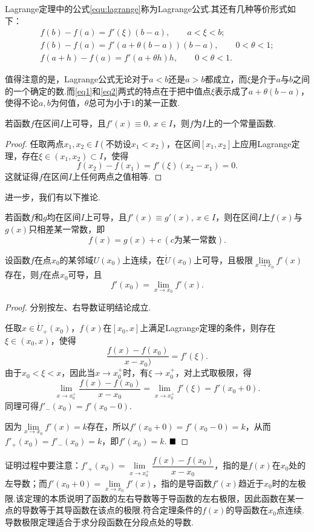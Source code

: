 Lagrange定理中的公式\ref{equ:lagrange}称为{\heiti Lagrange公式}.其还有几种等价形式如下：
\begin{align}
	f(b)-f(a)=f'(\xi)(b-a),\qquad a<\xi<b;\\
	\label{eq1}	f(b)-f(a)=f'(a+\theta(b-a))(b-a),\qquad 0<\theta<1;\\
	\label{eq2}	f(a+h)-f(a)=f'(a+\theta h)h,\qquad 0<\theta<1.
\end{align}

值得注意的是，Lagrange公式无论对于$a<b$还是$a>b$都成立，而$\xi$是介于$a$与$b$之间的一个确定的数.而\ref{eq1}和\ref{eq2}两式的特点在于把中值点$\xi$表示成了$a+\theta(b-a)$，使得不论$a,b$为何值，$\theta$总可为小于$1$的某一正数.
\begin{corollary}
	若函数$f$在区间$I$上可导，且$f'(x)\equiv 0,\ x\in I$，则$f$为$I$上的一个常量函数.
\end{corollary}
\begin{proof}
	任取两点$x_1,x_2\in I(\text{不妨设}x_1<x_2)$，在区间$\left[x_1,x_2\right]$上应用Lagrange定理，存在$\xi\in(x_1,x_2)\subset I$，使得
	$$f(x_2)-f(x_1)=f'(\xi)(x_2-x_1)=0.$$
	这就证得$f$在区间$I$上任何两点之值相等.
\end{proof}
进一步，我们有以下推论.
\begin{corollary}
	若函数$f$和$g$均在区间$I$上可导，且$f'(x)\equiv g'(x),\ x\in I$，则在区间$I$上$f(x)$与$g(x)$只相差某一常数，即
	$$f(x)=g(x)+c\ (c\text{为某一常数}).$$
\end{corollary}
\begin{corollary}[导数极限定理]
	设函数$f$在点$x_0$的某邻域$U(x_0)$上连续，在$\mathring{U}(x_0)$上可导，且极限$\lim\limits_{x\to x_0}f'(x)$存在，则$f$在点$x_0$可导，且
	$$f'(x_0)=\lim\limits_{x\to x_0}f'(x).$$
\end{corollary}
\begin{proof}
	分别按左、右导数证明结论成立.
	
	任取$x\in \mathring{U}_+(x_0)$，$f(x)$在$\left[x_0,x\right]$上满足Lagrange定理的条件，则存在$\xi\in(x_0,x)$，使得
	$$\frac{f(x)-f(x_0)}{x-x_0)}=f'(\xi).$$
	由于$x_0<\xi<x$，因此当$x\to x_0^+$时，有$\xi\to x_0^+$，对上式取极限，得
	$$\lim\limits_{x\to x_0^+}\frac{f(x)-f(x_0)}{x-x_0}=\lim\limits_{x\to x_0^+}f'(\xi)=f'(x_0+0).$$
	同理可得$f'_-(x_0)=f'(x_0-0).$
	
	因为$\lim\limits_{x\to x_0}f'(x)=k$存在，所以$f'(x_0+0)=f'(x_0-0)=k$，从而$f'_+(x_0)=f'_-(x_0)=k$，即$f'(x_0)=k$.
	$\hfill\blacksquare$
\end{proof}
\begin{remark}
	证明过程中要注意：$f'_+(x_0)=\lim\limits_{x\to x_0^+}\dfrac{f(x)-f(x_0)}{x-x_0}$，指的是$f(x)$在$x_0$处的左导数；而$f'(x_0+0)=\lim\limits_{x\to x_0}f'(x)$，指的是导函数$f'(x)$趋近于$x_0$时的左极限.该定理的本质说明了函数的左右导数等于导函数的左右极限，因此函数在某一点的导数等于其导函数在该点的极限.符合定理条件的$f(x)$的导函数在$x_0$点连续.导数极限定理适合于求分段函数在分段点处的导数.
\end{remark}
